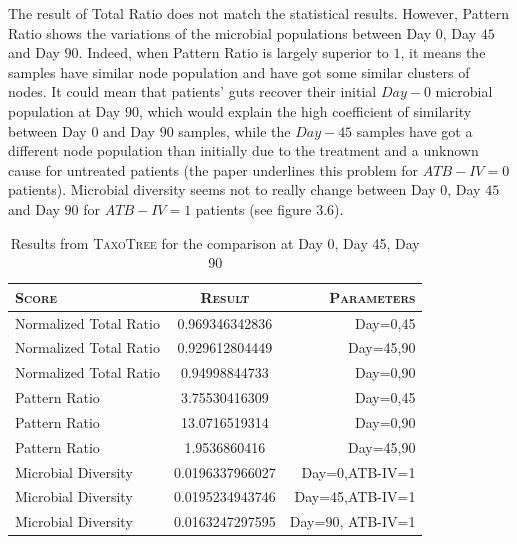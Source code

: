 \documentclass{report}
\begin{document}
\begin{itemize}
The result of Total Ratio does not match the statistical results. However, Pattern Ratio shows the variations of the microbial populations between Day $0$, Day $45$ and Day $90$. Indeed, when Pattern Ratio is largely superior to $1$, it means the samples have similar node population and have got some similar clusters of nodes. It could mean that patients' guts recover their initial $Day-0$ microbial population at Day $90$, which would explain the high coefficient of similarity between Day $0$ and Day $90$ samples, while the $Day-45$ samples have got a different node population than initially due to the treatment and a unknown cause for untreated patients (the paper underlines this problem for $ATB-IV = 0$ patients). Microbial diversity seems not to really change between Day $0$, Day $45$ and Day $90$ for $ATB-IV = 1$ patients (see figure $3.6$).

     \begin{table}
       \caption{Results from \textsc{TaxoTree} for the comparison at Day 0, Day 45, Day 90}
       \begin{tabular}{|l|c|r|}
         \hline
         \textsc{Score} & \textsc{Result} & \textsc{Parameters}\\
         \hline
         Normalized Total Ratio & 0.969346342836 & Day=0,45\\
         \hline
         Normalized Total Ratio & 0.929612804449 & Day=45,90\\
         \hline
         Normalized Total Ratio & 0.94998844733 & Day=0,90\\
         \hline
         Pattern Ratio & 3.75530416309 & Day=0,45 \\
         \hline
         Pattern Ratio & 13.0716519314 & Day=0,90 \\
         \hline
         Pattern Ratio & 1.9536860416 & Day=45,90 \\
         \hline
         Microbial Diversity & 0.0196337966027 & Day=0,ATB-IV=1 \\
         \hline
         Microbial Diversity & 0.0195234943746 & Day=45,ATB-IV=1 \\
         \hline
         Microbial Diversity & 0.0163247297595 & Day=90, ATB-IV=1\\
         \hline
       \end{tabular}
     \end{table}


\end{itemize}
\end{document}
